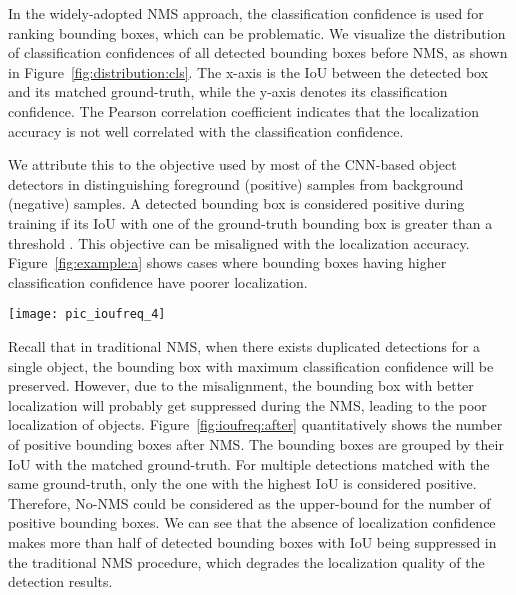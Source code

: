 \documentclass[runningheads]{llncs}
\begin{document}
In the widely-adopted NMS approach, the classification confidence is used for ranking bounding boxes, which can be problematic.
We visualize the distribution of classification confidences of all detected bounding boxes before NMS, as shown in Figure~\ref{fig:distribution:cls}. The x-axis is the IoU between the detected box and its matched ground-truth, while the y-axis denotes its classification confidence. The Pearson correlation coefficient indicates that the localization accuracy is not well correlated with the classification confidence.


We attribute this to the objective used by most of the CNN-based object detectors in distinguishing foreground (positive) samples from background (negative) samples. A detected bounding box  is considered positive during training if its IoU with one of the ground-truth bounding box is greater than a threshold .
This objective can be misaligned with the localization accuracy. 
Figure~\ref{fig:example:a} shows cases where bounding boxes having higher classification confidence have poorer localization. 

\begin{SCfigure}
\centering
\texttt{[image: pic\_ioufreq\_4]}
\caption{
The number of positive bounding boxes after the NMS, grouped by their IoU with the matched ground-truth. 
In traditional NMS (blue bar), a significant portion of accurately localized bounding boxes get mistakenly suppressed due to the misalignment of classification confidence and localization accuracy, while IoU-guided NMS (yellow bar) preserves more accurately localized bounding boxes.
}
\label{fig:ioufreq:after}
\end{SCfigure}

Recall that in traditional NMS, when there exists duplicated detections for a single object, the bounding box with maximum classification confidence will be preserved. However, due to the misalignment, the bounding box with better localization will probably get suppressed during the NMS, leading to the poor localization of objects. Figure~\ref{fig:ioufreq:after} quantitatively shows the number of positive bounding boxes after NMS. The bounding boxes are grouped by their IoU with the matched ground-truth. For multiple detections matched with the same ground-truth, only the one with the highest IoU is considered positive. Therefore, No-NMS could be considered as the upper-bound for the number of positive bounding boxes. We can see that the absence of localization confidence makes more than half of detected bounding boxes with IoU  being suppressed in the traditional NMS procedure, which degrades the localization quality of the detection results.
\end{document}

